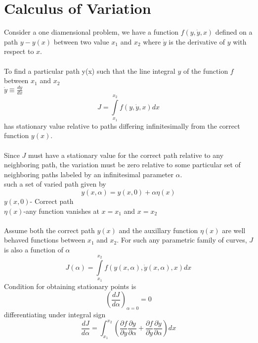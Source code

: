 	\section{Calculus of Variation}
	Consider a one diamensional problem, we have a function $f(y,\dot{y},x)$ defined on a path $y-y(x)$  between two value $x_1$ and $x_2$ where $\dot{y}$ is the derivative of $y$ with respect to $x$.\\\\
	To find a particular path y(x) such that the line integral $y$ of the function $f$ between $x_1$ and $x_2$\\
	$ \dot{y}\equiv \frac{dy}{dx}$
	\begin{equation}
	J=\int\limits_{x_1}^{x_2}f(y,\dot{y},x)dx
	\end{equation}
 	has stationary value relative to paths differing infinitesimally from the correct function $y(x)$.\\\\
 	Since $J$ must have a stationary value for the correct path relative to any neighboring path, the variation must be zero relative to some particular set of neighboring paths labeled by an infinitesimal parameter $\alpha$.\\
 	such a set of varied path given by 
 	\begin{equation}
 	y(x,\alpha)=y(x,0)+\alpha \eta(x)\label{VP-eq04}
 	\end{equation}
	$y(x,0)$- Correct path\\
	$\eta(x)$-any function vanishes at $x=x_1$ and $x=x_2$\\\\
	Assume both the correct path $y(x)$ and the auxillary function $\eta(x)$ are well behaved functions between $x_1$ and $x_2$. For such any parametric family of curves, $J$ is also a function of $\alpha$
	\begin{equation}
	J(\alpha)=\int\limits_{x_1}^{x_2}f(y(x,\alpha),\dot{y}(x,\alpha),x)dx
	\end{equation}
	 Condition for obtaining stationary points is 
	 \begin{equation}
	 \left( \frac{dJ}{d\alpha}\right) _{\alpha=0}=0
	 \end{equation}
	differentiating under integral sign 
	\begin{equation}
	\frac{d J}{d \alpha}=\int_{x_{1}}^{x_{2}}\left(\frac{\partial f}{\partial y} \frac{\partial y}{\partial \alpha}+\frac{\partial f}{\partial \dot{y}} \frac{\partial \dot{y}}{\partial \alpha}\right) d x
	\end{equation}
